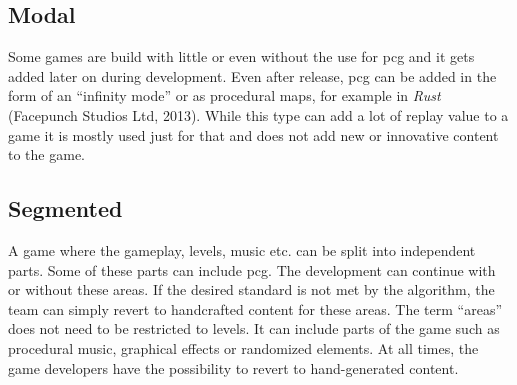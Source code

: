 \documentclass[10pt,a4paper]{article}
\begin{document}
\subsection{Modal}
\begin{multicols}{2} Some games are build with little or even without the use for \gls{pcg} and it gets added later on during development. Even after release, \gls{pcg} can be added in the form of an “infinity mode” or as procedural maps, for example in \textit{Rust} (Facepunch Studios Ltd, 2013). While this type can add a lot of replay value to a game it is mostly used just for that and does not add new or innovative content to the game.
\end{multicols}
\subsection{Segmented}
\begin{multicols}{2} A game where the gameplay, levels, music etc. can be split into independent parts. Some of these parts can include \gls{pcg}. The development can continue with or without these areas. If the desired standard is not met by the algorithm, the team can simply revert to handcrafted content for these areas. The term “areas” does not need to be restricted to levels. It can include parts of the game such as procedural music, graphical effects or randomized elements. At all times, the game developers have the possibility to revert to hand-generated content.
\end{multicols}
\end{document}
